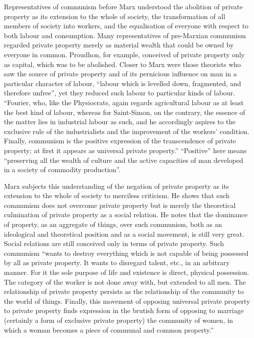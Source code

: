 \documentclass[../main]{subfiles}
\begin{document}
Representatives of communism before Marx understood the abolition of private property as its extension to the whole of society, the transformation of all members of society into workers, and the equalisation of everyone with respect to both labour and consumption. Many representatives of pre-Marxian communism regarded private property merely as material wealth that could be owned by everyone in common. Proudhon, for example, conceived of private property only as capital, which was to be abolished. Closer to Marx were those theorists who saw the source of private property and of its pernicious influence on man in a particular character of labour, “labour which is levelled down, fragmented, and therefore unfree”, yet they reduced such labour to particular kinds of labour. “Fourier, who, like the Physiocrats, again regards agricultural labour as at least the best kind of labour, whereas for Saint-Simon, on the contrary, the essence of the matter lies in industrial labour as such, and he accordingly aspires to the exclusive rule of the industrialists and the improvement of the workers’ condition. Finally, communism is the positive expression of the transcendence of private property; at first it appears as universal private property.” “Positive” here means “preserving all the wealth of culture and the active capacities of man developed in a society of commodity production”.

Marx subjects this understanding of the negation of private property as its extension to the whole of society to merciless criticism. He shows that such communism does not overcome private property but is merely the theoretical culmination of private property as a social relation. He notes that the dominance of property, as an aggregate of things, over such communism, both as an ideological and theoretical position and as a social movement, is still very great. Social relations are still conceived only in terms of private property. Such communism “wants to destroy everything which is not capable of being possessed by all as private property. It wants to disregard talent, etc., in an arbitrary manner. For it the sole purpose of life and existence is direct, physical possession. The category of the worker is not done away with, but extended to all men. The relationship of private property persists as the relationship of the community to the world of things. Finally, this movement of opposing universal private property to private property finds expression in the brutish form of opposing to marriage (certainly a form of exclusive private property) the community of women, in which a woman becomes a piece of communal and common property.”
\end{document}
